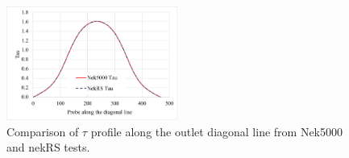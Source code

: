 \begin{figure}[!ht]
\centering
\includegraphics[width=0.5\textwidth]{./figures/tau_verification_bundle2x2.png}
\caption{Comparison of $\tau$ profile along the outlet diagonal line from Nek5000 and nekRS tests. }
\label{fig:tauplot}
\end{figure}
